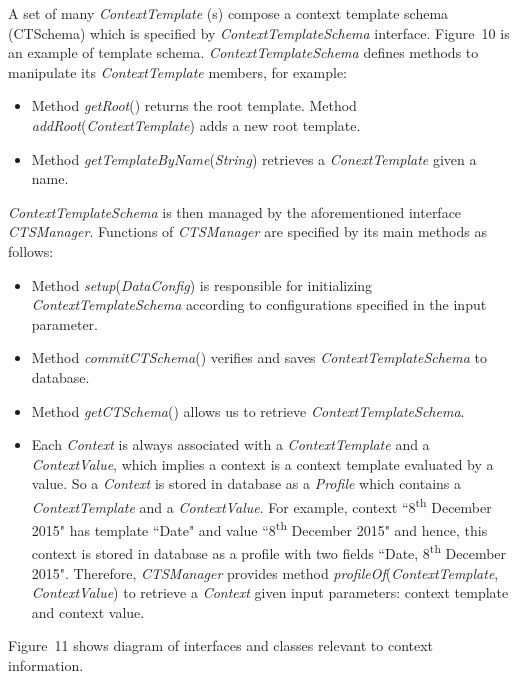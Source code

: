 \documentclass[a4paper]{llncs}
\begin{document}
A set of many \textit{ContextTemplate} (s) compose a context template schema (CTSchema) which is specified by \textit{ContextTemplateSchema} interface. Figure~10 is an example of template schema. \textit{ContextTemplateSchema} defines methods to manipulate its \textit{ContextTemplate} members, for example:
\begin{itemize}
\item Method \textit{getRoot}() returns the root template. Method \textit{addRoot}(\textit{ContextTemplate}) adds a new root template.
\item Method \textit{getTemplateByName}(\textit{String}) retrieves a \textit{ConextTemplate} given a name.
\end{itemize}
\textit{ContextTemplateSchema} is then managed by the aforementioned interface \textit{CTSManager}. Functions of \textit{CTSManager} are specified by its main methods as follows:
\begin{itemize}
\item Method \textit{setup}(\textit{DataConfig}) is responsible for initializing \textit{ContextTemplateSchema} according to configurations specified in the input parameter.
\item Method \textit{commitCTSchema}() verifies and saves \textit{ContextTemplateSchema} to database.
\item Method \textit{getCTSchema}() allows us to retrieve \textit{ContextTemplateSchema}.
\item Each \textit{Context} is always associated with a \textit{ContextTemplate} and a \textit{ContextValue}, which implies a context is a context template evaluated by a value. So a \textit{Context} is stored in database as a \textit{Profile} which contains a \textit{ContextTemplate} and a \textit{ContextValue}. For example, context ``8\textsuperscript{th} December 2015" has template ``Date" and value ``8\textsuperscript{th} December 2015" and hence, this context is stored in database as a profile with two fields ``Date, 8\textsuperscript{th} December 2015". Therefore, \textit{CTSManager} provides method \textit{profileOf}(\textit{ContextTemplate}, \textit{ContextValue}) to retrieve a \textit{Context} given input parameters: context template and context value.
\end{itemize}
Figure~11 shows diagram of interfaces and classes relevant to context information.
\end{document}
